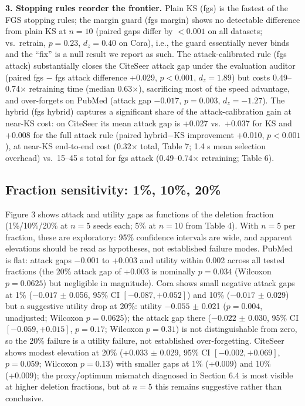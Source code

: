 \documentclass[pdflatex,sn-basic,Numbered]{sn-jnl}
\begin{document}
\textbf{3. Stopping rules reorder the frontier.} Plain KS (fgs) is the fastest of the FGS stopping rules; the margin guard (fgs margin) shows no detectable difference from plain KS at $n = 10$ (paired gaps differ by $< 0.001$ on all datasets; vs.\ retrain, $p = 0.23$, $d_z = 0.40$ on Cora), i.e., the guard essentially never binds and the ``fix'' is a null result we report as such. The attack-calibrated rule (fgs attack) substantially closes the CiteSeer attack gap under the evaluation auditor (paired fgs $-$ fgs attack difference +0.029, $p < 0.001$, $d_z = 1.89$) but costs 0.49--0.74$\times$ retraining time (median 0.63$\times$), sacrificing most of the speed advantage, and over-forgets on PubMed (attack gap $-0.017$, $p = 0.003$, $d_z = -1.27$). The hybrid (fgs hybrid) captures a significant share of the attack-calibration gain at near-KS cost: on CiteSeer its mean attack gap is +0.027 vs.\ +0.037 for KS and +0.008 for the full attack rule (paired hybrid$-$KS improvement +0.010, $p < 0.001$), at near-KS end-to-end cost (0.32$\times$ total, Table 7; 1.4 s mean selection overhead) vs.\ 15--45 s total for fgs attack (0.49--0.74$\times$ retraining; Table 6).

\subsection{Fraction sensitivity: 1\%, 10\%, 20\%}
Figure 3 shows attack and utility gaps as functions of the deletion fraction (1\%/10\%/20\% at $n = 5$ seeds each; 5\% at $n = 10$ from Table 4). With $n = 5$ per fraction, these are exploratory: 95\% confidence intervals are wide, and apparent elevations should be read as hypotheses, not established failure modes. PubMed is flat: attack gaps $-0.001$ to +0.003 and utility within 0.002 across all tested fractions (the 20\% attack gap of +0.003 is nominally $p = 0.034$ (Wilcoxon $p = 0.0625$) but negligible in magnitude). Cora shows small negative attack gaps at 1\% ($-0.017$ $\pm$ 0.056, 95\% CI $[-0.087, +0.052]$) and 10\% ($-0.017$ $\pm$ 0.029) but a suggestive utility drop at 20\%: utility $-0.055$ $\pm$ 0.021 ($p = 0.004$, unadjusted; Wilcoxon $p = 0.0625$); the attack gap there ($-0.022$ $\pm$ 0.030, 95\% CI $[-0.059, +0.015]$, $p = 0.17$; Wilcoxon $p = 0.31$) is not distinguishable from zero, so the 20\% failure is a utility failure, not established over-forgetting. CiteSeer shows modest elevation at 20\% (+0.033 $\pm$ 0.029, 95\% CI $[-0.002, +0.069]$, $p = 0.059$; Wilcoxon $p = 0.13$) with smaller gaps at 1\% (+0.009) and 10\% (+0.009); the proxy/optimum mismatch diagnosed in Section 6.4 is most visible at higher deletion fractions, but at $n = 5$ this remains suggestive rather than conclusive.
\end{document}
